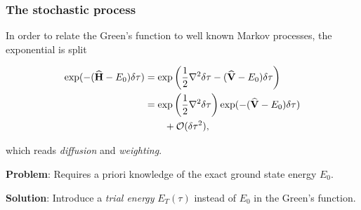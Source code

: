 %   
%     

\begin{frame}
\frametitle{The stochastic process}
 In order to relate the Green's function to well known Markov processes, the exponential is split
 
 \begin{align*}
  \exp(-({\bf\widehat{H}} - E_0)\delta\tau) &= \exp\left(\frac{1}{2}\nabla^2\delta\tau - ({\bf\widehat{V}} - E_0)\delta\tau\right)\\
     &= \exp\left(\frac{1}{2}\nabla^2\delta\tau\right)\exp( - ({\bf\widehat{V}} - E_0)\delta\tau) \\
     & \qquad  + \mathcal{O}(\delta\tau^2),
 \end{align*}
 
which reads \textit{diffusion} and \textit{weighting}.
 
\end{frame}

\begin{frame}
%  
% 
 
 \textbf{Problem}: Requires a priori knowledge of the exact ground state energy $E_0$.
 \shift
 
 \textbf{Solution}: Introduce a \textit{trial energy} $E_T(\tau)$ instead of $E_0$ in the Green's function.
 
\end{frame}

